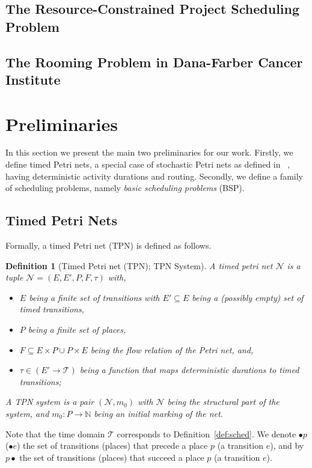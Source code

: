 \documentclass[11pt]{article}
\newtheorem{mydef}{Definition}
\begin{document}
\subsection{The Resource-Constrained Project Scheduling Problem}


\subsection{The Rooming Problem in Dana-Farber Cancer Institute}



\section{Preliminaries}

In this section we present 
the main two preliminaries for 
our work. Firstly, we define timed Petri nets, a special case of 
stochastic Petri nets as defined in ~\cite[Chapter 2]{haas2002stochastic},
having 
deterministic activity durations and routing. Secondly, we define a family of scheduling problems,
namely \emph{basic scheduling problems} (BSP).

\subsection{Timed Petri Nets}
Formally, a timed Petri net (TPN) is defined as follows. 

\begin{mydef} [Timed Petri net (TPN); TPN System] \label{def:tpn}
	A timed petri net $\mathcal{N}$ is a 
	tuple $\mathcal{N} = (E, E',P, F, \tau)$ with,
	\begin{itemize}
		\item $E$ being a finite set of transitions with $E' \subseteq E$ being a (possibly empty) set of timed transitions, 
		\item $P$ being a finite set of places,
		\item $F \subseteq E \times P \cup P \times E $ being the flow relation of the Petri net, and, 
		\item $\tau \in (E' \rightarrow \mathcal{T})$ being a function that maps deterministic durations
		to timed transitions;
	\end{itemize} A TPN system is a pair $(\mathcal{N}, m_0)$ with $\mathcal{N}$ being the structural part of the system, and $m_0: P \rightarrow \mathbb{N}$ being an initial marking of the net. 
\end{mydef} \noindent Note that the time domain $\mathcal{T}$ corresponds to 
Definition~\ref{def:sched}. We denote $\bullet p$ ($\bullet e$) the set of
transitions (places) that precede a place $p$ (a transition $e$), and by $p \bullet$ the 
set of transitions (places) that succeed a place $p$ (a transition $e$). 
\end{document}
